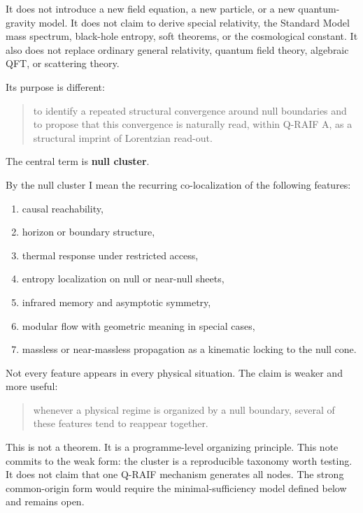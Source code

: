\documentclass[12pt,a4paper]{article}
\theoremstyle{definition}
\theoremstyle{remark}
\newcommand{\tightlist}{%
  \setlength{\itemsep}{0pt}\setlength{\parskip}{0pt}}
\begin{document}
It does not introduce a new field equation, a new particle, or a new
quantum-gravity model. It does not claim to derive special relativity,
the Standard Model mass spectrum, black-hole entropy, soft theorems, or
the cosmological constant. It also does not replace ordinary general
relativity, quantum field theory, algebraic QFT, or scattering theory.

Its purpose is different:

\begin{quote}
to identify a repeated structural convergence around null boundaries and
to propose that this convergence is naturally read, within Q-RAIF A, as
a structural imprint of Lorentzian read-out.
\end{quote}

The central term is \textbf{null cluster}.

By the null cluster I mean the recurring co-localization of the
following features:

\begin{enumerate}[leftmargin=*]
\tightlist
\item
  causal reachability,
\item
  horizon or boundary structure,
\item
  thermal response under restricted access,
\item
  entropy localization on null or near-null sheets,
\item
  infrared memory and asymptotic symmetry,
\item
  modular flow with geometric meaning in special cases,
\item
  massless or near-massless propagation as a kinematic locking to the
  null cone.
\end{enumerate}

Not every feature appears in every physical situation. The claim is
weaker and more useful:

\begin{quote}
whenever a physical regime is organized by a null boundary, several of
these features tend to reappear together.
\end{quote}

This is not a theorem. It is a programme-level organizing principle.
This note commits to the weak form: the cluster is a reproducible taxonomy worth testing.  It does not claim that one Q-RAIF mechanism generates all nodes.  The strong common-origin form would require the minimal-sufficiency model defined below and remains open.
\end{document}
